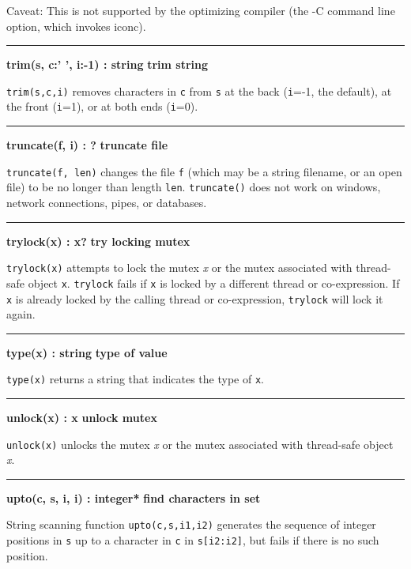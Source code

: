 Caveat: This is not supported by the optimizing
compiler (the -C command line option, which invokes iconc).

\bigskip\hrule\vspace{0.1cm}
\noindent
{\bf trim(s, c:' ', i:{}-1) : string } \hfill {\bf trim string}

\noindent
{}\texttt{trim(s,c,i)} removes characters in \texttt{c}
from \texttt{s} at the back (\texttt{i}=-1, the default), at the front
(\texttt{i}=1), or at both ends (\texttt{i}=0).

\bigskip\hrule\vspace{0.1cm}
\noindent
{\bf truncate(f, i) : ? } \hfill {\bf truncate file}

\noindent
{}\texttt{truncate(f, len)} changes the file
\texttt{f} (which may be a string filename, or an open file) to be no
longer than length \texttt{len}. \texttt{truncate()} does not work on
windows, network connections, pipes, or databases.

\bigskip\hrule\vspace{0.1cm}
\noindent
{\bf trylock(x) : x? } \hfill {\bf try locking mutex}

\noindent
{}\texttt{trylock(x)} attempts to lock the mutex {\textit x} or the
mutex associated with thread-safe object \texttt{x}. \texttt{trylock} fails
if \texttt{x} is locked by a different thread or co-expression. If \texttt{x}
is already locked by the calling thread or co-expression, \texttt{trylock}
will lock it again.

\bigskip\hrule\vspace{0.1cm}
\noindent
{\bf type(x) : string } \hfill {\bf type of value}

\noindent
{}\texttt{type(x)} returns a string that indicates the type
of \texttt{x}.

\bigskip\hrule\vspace{0.1cm}
\noindent
{\bf unlock(x) : x } \hfill {\bf unlock mutex}

\noindent
{}\texttt{unlock(x)} unlocks the mutex {\textit x} or the mutex
associated with thread-safe object {\textit x}.

\bigskip\hrule\vspace{0.1cm}
\noindent
{\bf upto(c, s, i, i) : integer* } \hfill {\bf find characters in set}

\noindent
String scanning function \texttt{upto(c,s,i1,i2)}
generates the sequence of integer positions in \texttt{s} up to a
character in \texttt{c} in \texttt{s[i2:i2]}, but fails if there is no
such position.

